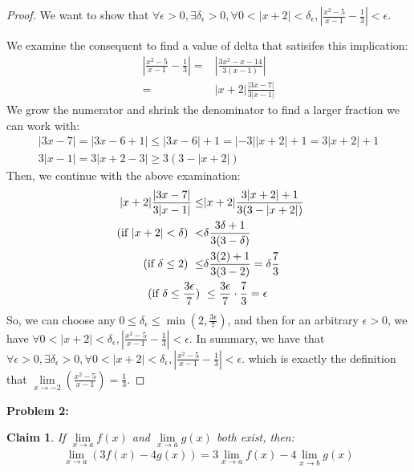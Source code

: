 \documentclass{article}
\newcommand{\eps}{\ensuremath{\epsilon}}
\newcommand{\limx}[2]{\ensuremath{\underset{x\to #2 }{\lim} #1 (x)}}
\newtheorem{clm}{Claim}
\begin{document}
\begin{proof}
	We want to show that
	$\forall \eps > 0, \exists \delta_\eps > 0,
	\forall 0 < |x + 2| < \delta_\eps, |\frac{x^2-5}{x-1} - \frac{1}{3}| < \eps$.

	We examine the consequent to find a value of delta
	that satisifes this implication:
	\begin{align}
		|\frac{x^2-5}{x-1} - \frac{1}{3}| = & | \frac{3x^2 - x - 14}{3(x-1)}| \\
		= & |x+2| \frac{|3x-7|}{3|x - 1|}
	\end{align}
	We grow the numerator and shrink the denominator to find a larger fraction we can work with:
	\begin{align}
		|3x-7| = |3x -6 + 1| \le |3x - 6| + 1 = |-3||x + 2| + 1 = 3|x + 2| + 1 \\
		3|x - 1| = 3|x + 2 - 3| \geq 3(3 - |x + 2|)
	\end{align}
	Then, we continue with the above examination:
	\begin{align}
		|x+2| \frac{|3x-7|}{3|x - 1|} \le & |x + 2| \frac{3|x+2| + 1}{3(3 - |x + 2|)} \\
		\textrm{ (if $ |x + 2| < \delta$) } < & \delta\frac{3\delta+1}{3(3 - \delta)} \\
		\textrm{ (if $\delta \le 2$) } \le & \delta\frac{3(2)+1}{3(3 - 2)} = \delta\frac{7}{3} \\
		\textrm{ (if $\delta \le \frac{3 \eps}{7}$) } & \le \frac{3\eps}{7} \cdot \frac{7}{3} = \eps
	\end{align}
	So, we can choose any $0 \le \delta_\eps \le \min(2, \frac{3\eps}{7})$,
	and then for an arbitrary $\eps > 0$,
	we have 
	$\forall 0 < |x + 2| < \delta_\eps, |\frac{x^2-5}{x-1} - \frac{1}{3}| < \eps$.
	In summary,
	we have that
	$\forall \eps > 0,
	\exists \delta_\eps > 0,
	\forall 0 < |x + 2| < \delta_\eps, |\frac{x^2-5}{x-1} - \frac{1}{3}| < \eps$.
	which is exactly the definition that 
	$\underset{x\to -2}{\lim} (\frac{x^2 - 5}{x - 1}) = \frac{1}{3}$.
\end{proof}

\textbf{Problem 2:}

\begin{clm}
	If $\limx{f}{a}$ and $\limx{g}{a}$ both exist, then:
	\begin{align}
		\underset{x \to a}{\lim} (3f(x) - 4g(x))  = 3\limx{f}{a} - 4\limx{g}{b}
	\end{align}
\end{clm}
\end{document}
